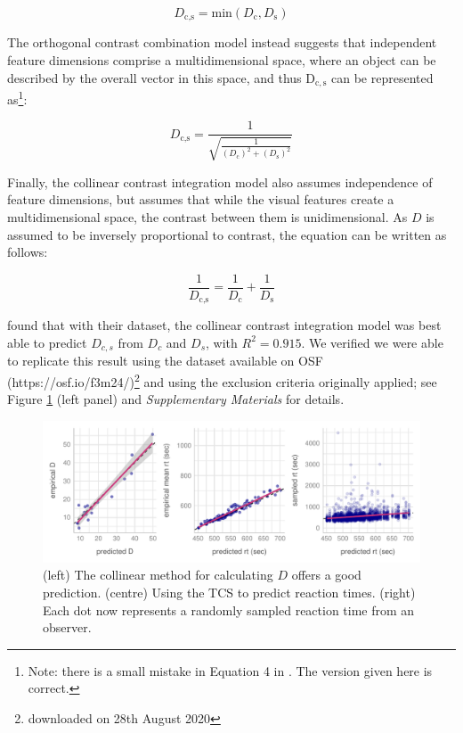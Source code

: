 \documentclass[smallextended, natbib]{svjour3}       %
\begin{document}
\begin{equation}
D_\text{c,s} = \text{min}\left(D_\text{c}, D_\text{s}\right)
\label{eq:bestfeature}
\end{equation}

The orthogonal contrast combination model instead suggests that independent feature dimensions comprise a multidimensional space, where an object can be described by the overall vector in this space, and thus $\mathrm{D_{c,s}}$ can be represented as\footnote{Note: there is a small mistake in Equation 4 in \cite{buetti2019predicting}. The version given here is correct.}:

\begin{equation}
D_\text{c,s} = \frac{1}{\sqrt{\frac{1}{(D_\text{c})^2 + (D_\text{s})^2}}}
\label{eq:orthogonalcontrast}
\end{equation}

Finally, the collinear contrast integration model also assumes independence of feature dimensions, but assumes that while the visual features create a multidimensional space, the contrast between them is unidimensional. As $D$ is assumed to be inversely proportional to contrast, the equation can be written as follows:

\begin{equation}
\frac{1}{D_\text{c,s}} = \frac{1}{D_\text{c}} + \frac{1}{D_\text{s}}
\label{eq:collinearcontrast}
\end{equation}

\cite{buetti2019predicting} found that with their dataset, the collinear contrast integration model was best able to predict $D_{c,s}$ from $D_c$ and $D_s$, with $R^2 = 0.915$. We verified we were able to replicate this result using the dataset available on OSF (https://osf.io/f3m24/)\footnote{downloaded on 28th August 2020} and using the exclusion criteria originally applied; see Figure \ref{fig:comp_rep} (left panel) and \textit{Supplementary Materials} for details.

\begin{figure}
\centering
\includegraphics[width=\textwidth]{../plots/computational_replication.pdf}
\caption{(left) The collinear method for calculating $D$ offers a good prediction. (centre) Using the TCS to predict reaction times. (right) Each dot now represents a randomly sampled reaction time from an observer.}
\label{fig:comp_rep}
\end{figure}
\end{document}

